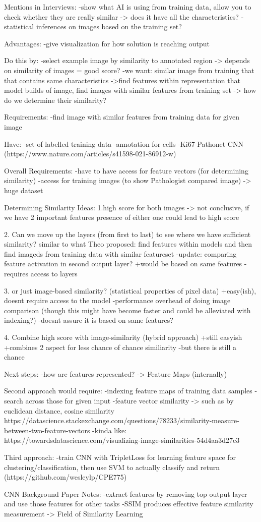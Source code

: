 Mentions in Interviews:
-show what AI is using from training data, allow you to check whether they are really similar -> does it have all the characteristics?
-statistical inferences on images based on the training set?

Advantages:
-give visualization for how solution is reaching output

Do this by:
-select example image by similarity to annotated region -> depends on similarity of images = good score?
-we want: similar image from training that that contains same characteristics
->find features within representation that model builds of image, find images with similar features from training set
-> how do we determine their similarity?

Requirements:
-find image with similar features from training data for given image

Have:
-set of labelled training data
-annotation for cells
-Ki67 Pathonet CNN (https://www.nature.com/articles/s41598-021-86912-w)

Overall Requirements:
-have to have access for feature vectors (for determining similarity)
-access for training images (to show Pathologist compared image) -> huge dataset

Determining Similarity Ideas:
1.high score for both images -> not conclusive, if we have 2 important features presence of either one could lead to high score

2. Can we move up the layers (from first to last) to see where we have sufficient similarity? similar to what Theo proposed: find features within models and then find imageds from training data with similar featureset
-update: comparing feature activation in second output layer?
+would be based on same features
-requires access to layers

3. or just image-based similarity? (statistical properties of pixel data)
+easy(ish), doesnt require access to the model
-performance overhead of doing image comparison (though this might have become faster and could be alleviated with indexing?)
-doesnt assure it is based on same features?

4. Combine high score with image-similarity (hybrid approach)
+still easyish
+combines 2 aspect for less chance of chance similiarity
-but there is still a chance

Next steps:
-how are features represented? -> Feature Maps (internally)

Second approach would require:
-indexing feature maps of training data samples
-search across those for given input
-feature vector similarity -> such as by euclidean distance, cosine similarity
https://datascience.stackexchange.com/questions/78233/similarity-measure-between-two-feature-vectors
-kinda like: https://towardsdatascience.com/visualizing-image-similarities-54d4aa3d27c3

Third approach:
-train CNN with TripletLoss for learning feature space for clustering/classification, then use SVM to actually classify and return (https://github.com/wesleylp/CPE775)


CNN Background Paper Notes:
-extract features by removing top output layer and use those features for other tasks
-SSIM produces effective feature similarity measurement
-> Field of Similarity Learning 
